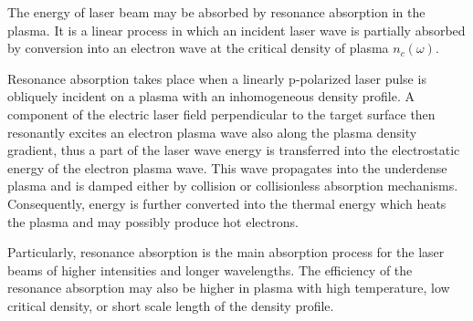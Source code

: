 The energy of laser beam may be absorbed by resonance absorption in the plasma. It is a linear process in which an incident laser wave is partially absorbed by conversion into an electron wave at the critical density of plasma $ n_c (\omega) $.

Resonance absorption takes place when a linearly p-polarized laser pulse is obliquely incident on a plasma with an inhomogeneous density profile. A component of the electric laser field perpendicular to the target surface then resonantly excites an electron plasma wave also along the plasma density gradient, thus a part of the laser wave energy is transferred into the electrostatic energy of the electron plasma wave. This wave propagates into the underdense plasma and is damped either by collision or collisionless absorption mechanisms. Consequently, energy is further converted into the thermal energy which heats the plasma and may possibly produce hot electrons.

Particularly, resonance absorption is the main absorption process for the laser beams of higher intensities and longer wavelengths. The efficiency of the resonance absorption may also be higher in plasma with high temperature, low critical density, or short scale length of the density profile.
